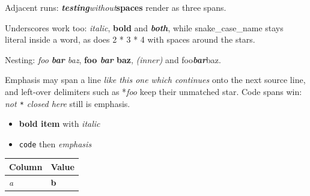 Adjacent runs: \textbf{\textit{testing}}\textit{without}\textbf{spaces} render as three spans.

Underscores work too: \textit{italic}, \textbf{bold} and \textbf{\textit{both}}, while snake\_case\_name stays literal inside a word, as does 2 * 3 * 4 with spaces around the stars.

Nesting: \textit{foo \textbf{bar} baz}, \textbf{foo \textit{bar} baz}, \textit{(\textit{inner})} and foo\textbf{\textit{bar}}baz.

Emphasis may span a line \textit{like this one which continues} onto the next source line, and left-over delimiters such as *\textit{foo} keep their unmatched star. Code spans win: \textit{not \texttt{*} closed here} still is emphasis.

\begin{itemize}
  \item \textbf{bold item} with \textit{italic}
  \item \texttt{code} then \textit{emphasis}
\end{itemize}

\begin{tabular}{ll}
\toprule
Column & Value \\
\midrule
\textit{a} & \textbf{b} \\
\bottomrule
\end{tabular}

